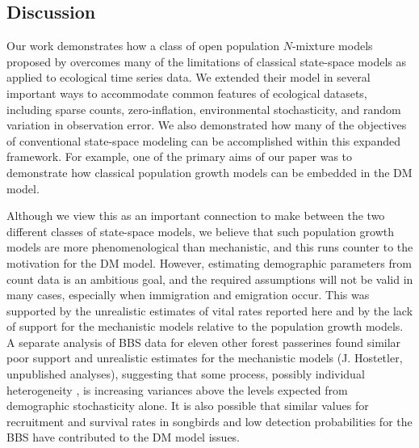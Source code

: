 \documentclass[12pt,english]{article}
\begin{document}
\begin{spacing}{1.9}
\begin{flushleft}
\section*{Discussion}

Our work demonstrates how a class of open population $N$-mixture models
proposed by \citet{dail_madsen:2011} overcomes 
many of the limitations of classical state-space models as applied to
ecological time series data.
We extended their model in several important
ways to accommodate common features of ecological
datasets, including sparse counts, zero-inflation, environmental
stochasticity, and random variation in observation error.
We also demonstrated how many of the objectives of conventional
state-space modeling can be accomplished within this expanded
framework. For example, one of the primary aims of our paper was to demonstrate how classical
population growth models can be embedded in the DM model.

Although we view this as an important connection to make between the two
different classes of state-space models, we believe that
such population growth models are more phenomenological
than mechanistic, and this runs counter to the motivation for
the DM model. However, estimating
demographic parameters from count data is an ambitious goal, and
the required assumptions will not be valid in many cases,
especially when immigration and emigration occur. This was supported by the
unrealistic estimates of vital rates reported here and by the
lack of support for the mechanistic models relative to the population
growth models.  A separate analysis of BBS data for eleven other forest passerines
found similar poor support and unrealistic estimates for the mechanistic 
models (J. Hostetler, unpublished analyses), suggesting that some process, possibly
individual heterogeneity \citep{vindenes_etal:2008}, is increasing variances
above the levels expected from demographic stochasticity alone.  It
is also possible that similar values for recruitment and survival rates in songbirds and low 
detection probabilities for the BBS have contributed %
to the DM model issues.


\end{flushleft}
\end{spacing}
\end{document}
